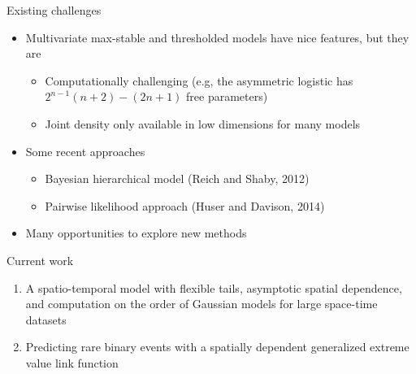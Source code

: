 \documentclass{beamer}
\begin{document}
\begin{frame}{Existing challenges}
  \begin{itemize} \setlength{\itemsep}{1em}
    \item Multivariate max-stable and thresholded models have nice features, but they are
    \begin{itemize}
      \item Computationally challenging (e.g,  the asymmetric logistic has $2^{n-1}(n + 2) - (2n + 1)$ free parameters)
      \item Joint density only available in low dimensions for many models
    \end{itemize}
    \item Some recent approaches
    \begin{itemize}
      \item Bayesian hierarchical model (Reich and Shaby, 2012)
      \item Pairwise likelihood approach (Huser and Davison, 2014)
    \end{itemize}
    \item Many opportunities to explore new methods
  \end{itemize}
\end{frame}

\begin{frame}{Current work}
\begin{adjustwidth}{1em}{0em}
  \begin{enumerate}[1.] \setlength{\itemsep}{1.5em}
    \item A spatio-temporal model with flexible tails, asymptotic spatial dependence, and computation on the order of Gaussian models for large space-time datasets
    \item Predicting rare binary events with a spatially dependent generalized extreme value link function
  \end{enumerate}
\end{adjustwidth}
\end{frame}
\end{document}
